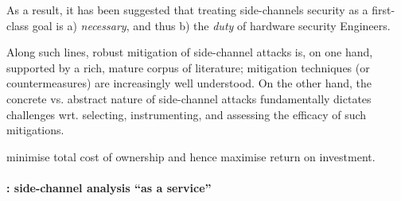 \noindent
As a result, it has been suggested that treating side-channels security as a first-class goal is
a) {\em necessary},
   and thus
b) the {\em duty} of hardware security Engineers.

Along such lines, robust mitigation of side-channel attacks is, on one hand,
supported by a rich, mature corpus of literature; mitigation techniques (or
countermeasures) are increasingly well understood.  On the other hand, the
concrete vs. abstract nature of side-channel attacks fundamentally dictates
challenges wrt. selecting, instrumenting, and assessing the efficacy of such
mitigations.


%
%
%
%

 minimise total cost of ownership
and hence maximise return on investment.


\paragraph{\LABID: side-channel analysis ``as a service''}


